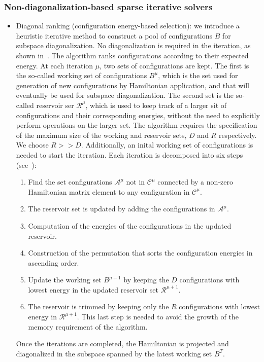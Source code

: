 \documentclass[
  reprint,            %
  amsmath,amssymb,
  aps,
  superscriptaddress, %
  longbibliography
]{revtex4-2}
\theoremstyle{definition}
\def\A{\mathcal{A}}
\def\C{\mathcal{C}}
\begin{document}
\subsubsection{Non-diagonalization-based sparse iterative solvers}
\label{ssapp:non_diagonalization_based}

\begin{itemize}
    \item Diagonal ranking (configuration energy-based selection): we introduce a heuristic iterative method to construct a pool of configurations $B$ for subspace diagonalization. No diagonalization is required in the iteration, as shown in~. The algorithm ranks configurations according to their expected energy. At each iteration $\mu$, two sets of configurations are kept. The first is the so-called working set of configurations $B^\mu$, which is the set used for generation of new configurations by Hamiltonian application, and that will eventually be used for subspace diagonalization. The second set is the so-called reservoir ser $\mathcal{R}^\mu$, which is used to keep track of a larger sit of configurations and their corresponding energies, without the need to explicitly perform operations on the larger set. The algorithm requires the specification of the maximum size of the working and reservoir sets,  $D$ and $R$ respectively. We choose $R>>D$. Additionally, an inital working set of configurations is needed to start the iteration. Each iteration is decomposed into six steps (see~):
    \begin{enumerate}
        \item Find the set configurations $\A^{\mu}$ not in $\C^\mu$ connected by a non-zero Hamiltonian matrix element to any configuration in $\C^\mu$.
        \item The reservoir set is updated by adding the configurations in $\A^{\mu}$.
        \item Computation of the energies of the configurations in the updated reservoir.
        \item Construction of the permutation that sorts the configuration energies in ascending order.
        \item Update the working set $B^{\mu+1}$ by keeping the $D$ configurations with lowest energy in the updated reservoir set $\mathcal{R}^{\mu + 1}$. 
        \item The reservoir is trimmed by keeping only the $R$ configurations with lowest energy in $\mathcal{R}^{\mu + 1}$. This last step is needed to avoid the growth of the memory requirement of the algorithm.
    \end{enumerate}
    Once the iterations are completed, the Hamiltonian is projected and diagonalized in the subspace spanned by the latest working set $B^T$.
    

\end{itemize}
\end{document}
